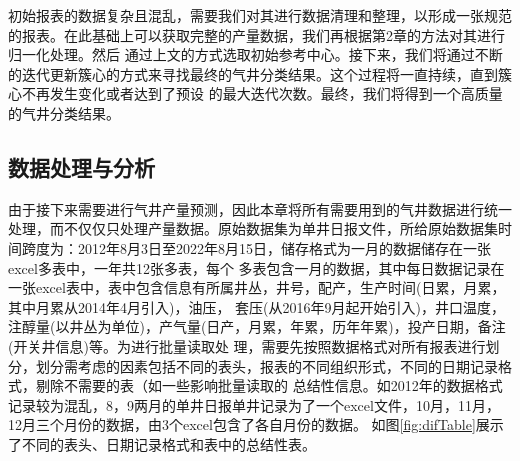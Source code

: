 初始报表的数据复杂且混乱，需要我们对其进行数据清理和整理，以形成一张规范的报表。在此基础上可以获取完整的产量数据，我们再根据第2章的方法对其进行归一化处理。然后
通过上文的方式选取初始参考中心。接下来，我们将通过不断的迭代更新簇心的方式来寻找最终的气井分类结果。这个过程将一直持续，直到簇心不再发生变化或者达到了预设
的最大迭代次数。最终，我们将得到一个高质量的气井分类结果。
\subsection{数据处理与分析}
由于接下来需要进行气井产量预测，因此本章将所有需要用到的气井数据进行统一处理，而不仅仅只处理产量数据。原始数据集为单井日报文件，所给原始数据集时间跨度为：2012年8月3日至2022年8月15日，储存格式为一月的数据储存在一张excel多表中，一年共12张多表，每个
多表包含一月的数据，其中每日数据记录在一张excel表中，表中包含信息有所属井丛，井号，配产，生产时间(日累，月累，其中月累从2014年4月引入)，油压，
套压(从2016年9月起开始引入)，井口温度，注醇量(以井丛为单位)，产气量(日产，月累，年累，历年年累)，投产日期，备注(开关井信息)等。为进行批量读取处
理，需要先按照数据格式对所有报表进行划分，划分需考虑的因素包括不同的表头，报表的不同组织形式，不同的日期记录格式，剔除不需要的表（如一些影响批量读取的
总结性信息。如2012年的数据格式记录较为混乱，8，9两月的单井日报单井记录为了一个excel文件，10月，11月，12月三个月份的数据，由3个excel包含了各自月份的数据。
如图\ref{fig:difTable}展示了不同的表头、日期记录格式和表中的总结性表。
